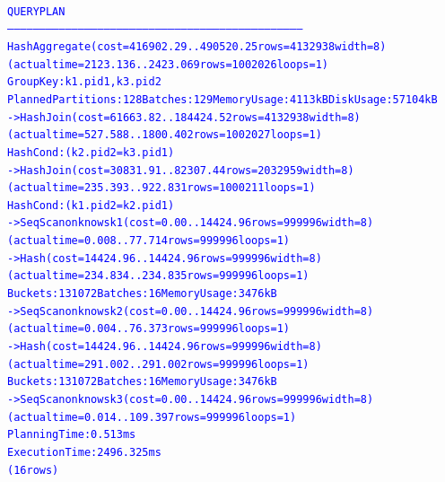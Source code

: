 \documentclass{article}
\begin{document}
    \begin{center}
      {\tiny
      \begin{alltt}
      \textcolor{blue}{
        QUERY PLAN                                                                
        -----------------------------------------------------------------------------------------------------------------------------------------
         HashAggregate  (cost=416902.29..490520.25 rows=4132938 width=8) (actual time=2123.136..2423.069 rows=1002026 loops=1)
           Group Key: k1.pid1, k3.pid2
           Planned Partitions: 128  Batches: 129  Memory Usage: 4113kB  Disk Usage: 57104kB
           ->  Hash Join  (cost=61663.82..184424.52 rows=4132938 width=8) (actual time=527.588..1800.402 rows=1002027 loops=1)
                 Hash Cond: (k2.pid2 = k3.pid1)
                 ->  Hash Join  (cost=30831.91..82307.44 rows=2032959 width=8) (actual time=235.393..922.831 rows=1000211 loops=1)
                       Hash Cond: (k1.pid2 = k2.pid1)
                       ->  Seq Scan on knows k1  (cost=0.00..14424.96 rows=999996 width=8) (actual time=0.008..77.714 rows=999996 loops=1)
                       ->  Hash  (cost=14424.96..14424.96 rows=999996 width=8) (actual time=234.834..234.835 rows=999996 loops=1)
                             Buckets: 131072  Batches: 16  Memory Usage: 3476kB
                             ->  Seq Scan on knows k2  (cost=0.00..14424.96 rows=999996 width=8) (actual time=0.004..76.373 rows=999996 loops=1)
                 ->  Hash  (cost=14424.96..14424.96 rows=999996 width=8) (actual time=291.002..291.002 rows=999996 loops=1)
                       Buckets: 131072  Batches: 16  Memory Usage: 3476kB
                       ->  Seq Scan on knows k3  (cost=0.00..14424.96 rows=999996 width=8) (actual time=0.014..109.397 rows=999996 loops=1)
         Planning Time: 0.513 ms
         Execution Time: 2496.325 ms
        (16 rows)
       }
      \end{alltt}
      }
    \end{center}
\end{document}
